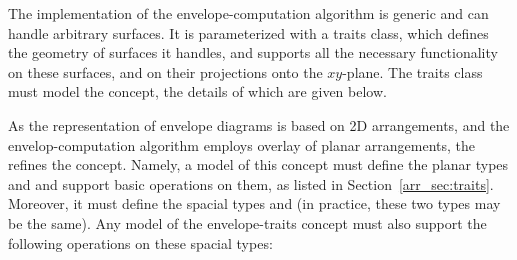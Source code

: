 The implementation of the envelope-computation algorithm is generic and
can handle arbitrary surfaces. It is parameterized with a traits class,
which defines the geometry of surfaces it handles, and supports all
the necessary functionality on these surfaces, and on their projections 
onto the $xy$-plane. The traits class must model the 
 concept, the details of which are given below.

As the representation of envelope diagrams is based on 2D
arrangements, and the envelop-computation algorithm employs overlay
of planar arrangements, the  refines the
 concept. Namely, a model of this 
concept must define the planar types  and 
 and support basic operations on them, as 
listed in Section~\ref{arr_sec:traits}. Moreover, it must define the 
spacial types  and  (in practice,
these two types may be the same). Any model of the envelope-traits
concept must also support the following operations on these spacial
types:

